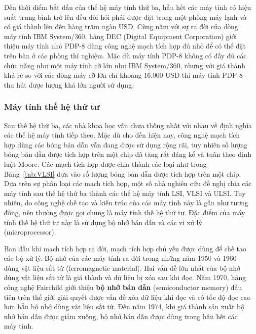 Đến thời điểm bắt đầu của thế hệ máy tính thứ ba, hầu hết các máy tính có hiệu suất trung bình trở lên đều đòi hỏi phải được đặt trong một phòng máy lạnh và có giá thành lên đến hàng trăm ngàn USD. Cùng năm với sự ra đời của dòng máy tính IBM System/360, hãng DEC (Digital Equipment Corporation) giới thiệu máy tính nhỏ PDP-8 dùng công nghệ mạch tích hợp đủ nhỏ để có thể đặt trên bàn ở các phòng thí nghiệm. Mặc dù máy tính PDP-8 không có đầy đủ các chức năng như một máy tính cỡ lớn như IBM System/360, nhưng với giá thành khá rẻ so với các dòng máy cỡ lớn chỉ khoảng 16.000 USD thì máy tính PDP-8 thu hút được lượng khá lớn người sử dụng.

\subsubsection{Máy tính thế hệ thứ tư}

Sau thế hệ thứ ba, các nhà khoa học vẫn chưa thống nhất với nhau về định nghĩa các thế hệ máy tính tiếp theo. Mặc dù cho đến hiện nay, công nghệ mạch tích hợp dùng các bóng bán dẫn vẫn đang được sử dụng rộng rãi, tuy nhiên số lượng bóng bán dẫn được tích hợp trên một chip đã tăng rất đáng kể và tuân theo định luật Moore. Các mạch tích hợp được chia thành các loại như trong Bảng~\ref{tab:VLSI} dựa vào số lượng bóng bán dẫn được tích hợp trên một chip. Dựa trên sự phân loại các mạch tích hợp, một số nhà nghiên cứu đề nghị chia các máy tính sau thế hệ thứ ba thành các thế hệ máy tính LSI, VLSI và ULSI. Tuy nhiên, do công nghệ chế tạo và kiến trúc của các máy tính này là gần như tương đồng, nên thường được gọi chung là máy tính thế hệ thứ tư. Đặc điểm của máy tính thế hệ thứ tư này là sử dụng bộ nhớ bán dẫn và các vi xử lý (microprocessor).

Ban đầu khi mạch tích hợp ra đời, mạch tích hợp chủ yếu được dùng để chế tạo các bộ xử lý. Bộ nhớ của các máy tính ra đời trong những năm 1950 và 1960 dùng vật liệu sắt từ (ferromagnetic material). Hai vấn đề lớn nhất của bộ nhớ dùng vật liệu sắt từ là giá thành và dữ liệu bị xóa sau khi đọc. Năm 1970, hãng công nghệ Fairchild giới thiệu \textbf{bộ nhớ bán dẫn} (semiconductor memory) đầu tiên trên thế giới giải quyết được vấn đề xóa dữ liệu khi đọc và có tốc độ đọc cao hơn hẳn bộ nhớ dùng vật liệu sắt từ. Đến năm 1974, khi giá thành sản xuất bộ nhớ bán dẫn được giảm xuống, bộ nhớ bán dẫn được dùng trong hầu hết các máy tính.

